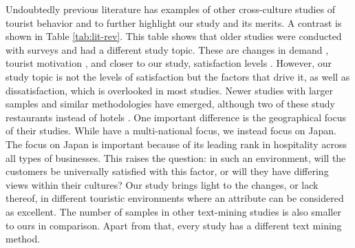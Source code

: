 \documentclass[smallextended,natbib]{svjour3}       %
\begin{document}
Undoubtedly previous literature has examples of other cross-culture studies of tourist behavior and to further highlight our study and its merits. A contrast is shown in Table \ref{tab:lit-rev}. This table shows that older studies were conducted with surveys and had a different study topic. These are changes in demand \cite{bauer1993changing}, tourist motivation \cite{kim2000}, and closer to our study, satisfaction levels \cite{choi2000}. However, our study topic is not the levels of satisfaction but the factors that drive it, as well as dissatisfaction, which is overlooked in most studies. Newer studies with larger samples and similar methodologies have emerged, although two of these study restaurants instead of hotels \cite{JIA2020104071, HUANG2017117}. One important difference is the geographical focus of their studies. While \cite{FRANCESCO201924, JIA2020104071, HUANG2017117} have a multi-national focus, we instead focus on Japan. The focus on Japan is important because of its leading rank in hospitality across all types of businesses. This raises the question: in such an environment, will the customers be universally satisfied with this factor, or will they have differing views within their cultures? Our study brings light to the changes, or lack thereof, in different touristic environments where an attribute can be considered as excellent. The number of samples in other text-mining studies is also smaller to ours in comparison. Apart from that, every study has a different text mining method.
\end{document}

